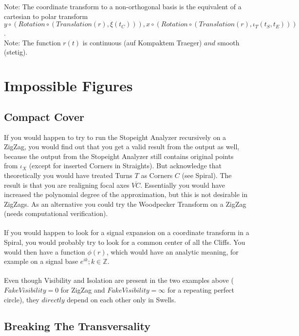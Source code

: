 \documentclass{report}
\begin{document}
Note: The coordinate transform to a non-orthogonal basis is the equivalent of a cartesian to polar transform $y\circ (Rotation\circ (Translation(r),\xi(t_{C}))),x\circ (Rotation\circ (Translation(r),\iota_{T}(t_{S},t_{E})))$.\\
Note: The function $r(t)$ is continuous (auf Kompaktem Traeger) $and$ smooth (stetig).

\section{Impossible Figures}

\subsection*{Compact Cover}

If you would happen to try to run the Stopeight Analyzer recursively on a ZigZag, you would find out that you get a valid result from the output as well, because the output from the Stopeight Analyzer still contains original points from $\iota_{X}$ (except for inserted Corners in Straights). But acknowledge that theoretically you would have treated Turns $T$ as Corners $C$ (see Spiral). The result is that you are realigning focal axes $\overline{VC}$. Essentially you would have increased the polynomial degree of the approximation, but this is not desirable in ZigZags. As an alternative you could try the Woodpecker Transform \cite{Woodpecker} on a ZigZag (needs computational verification).\\\\
If you would happen to look for a signal expansion on a coordinate transform in a Spiral, you would probably try to look for a common center of all the Cliffs. You would then have a function $\phi (r)$, which would have an analytic meaning, for example on a signal base $e^{ik};k \in \mathbb{Z}$.\\\\
Even though Visibility and Isolation are present in the two examples above ($Fake Visibility=0$ for ZigZag and $Fake Visibility=\infty$ for a repeating perfect circle), they $directly$ depend on each other only in Swells.

\subsection{Breaking The Transversality}
\end{document}
